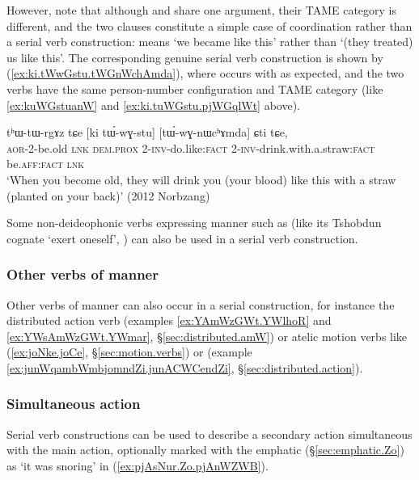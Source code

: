 However, note that although  and  share one argument, their TAME category is different, and the two clauses constitute a simple case of coordination rather than a serial verb construction:  means `we became like this' rather than `(they treated) us like this'. The corresponding genuine serial verb construction is shown by (\ref{ex:ki.tWwGstu.tWGnWchAmda}), where  occurs with  as expected, and the two verbs have the same person-number configuration and TAME category (like \ref{ex:kuWGstuanW} and \ref{ex:ki.tuWGstu.pjWGqlWt} above).

\begin{exe}
\ex   \label{ex:ki.tWwGstu.tWGnWchAmda}
\gll tʰɯ-tɯ-rgɤz tɕe [ki tɯ́-wɣ-stu] [tɯ́-wɣ-nɯcʰɤmda] ɕti tɕe, \\
\textsc{aor}-2-be.old \textsc{lnk} \textsc{dem}.\textsc{prox} 2-\textsc{inv}-do.like:\textsc{fact} 2-\textsc{inv}-drink.with.a.straw:\textsc{fact} be.\textsc{aff}:\textsc{fact} \textsc{lnk} \\
\glt `When you become old, they will drink you (your blood) like this with a straw (planted on your back)' (2012 Norbzang)
\end{exe}

Some non-deideophonic verbs expressing manner such as  (like its Tshobdun cognate  `exert oneself', \citealt[490--491]{sun12complementation}) can also be used in a serial verb construction.

\subsubsection{Other verbs of manner} \label{sec:svc.manner.other}
Other verbs of manner can also occur in a serial construction, for instance the distributed action verb  (examples \ref{ex:YAmWzGWt.YWlhoR} and \ref{ex:YWsAmWzGWt.YWmar}, §\ref{sec:distributed.amW}) or atelic motion verbs like  (\ref{ex:joNke.joCe}, §\ref{sec:motion.verbs}) or   (example \ref{ex:junWqambWmbjomndZi.junACWCendZi}, §\ref{sec:distributed.action}).

\subsubsection{Simultaneous action} \label{sec:svc.simultaneous}
Serial verb constructions can be used to describe a secondary action simultaneous with the main action, optionally marked with the emphatic  (§\ref{sec:emphatic.Zo}) as  `it was snoring' in (\ref{ex:pjAsNur.Zo.pjAnWZWB}).

